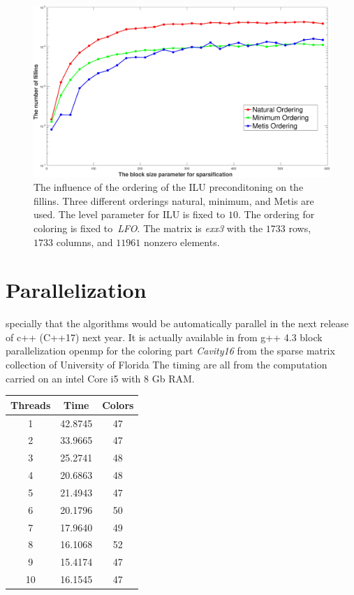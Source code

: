 \documentclass[12pt, oneside]{book}
\begin{document}
\begin{figure}
\centering
\includegraphics[width=0.9\linewidth]{fillin_blocksize.jpg}
\caption{The influence of the ordering of the ILU preconditoning 
on the fillins. 
Three different orderings natural, minimum, and Metis are used.
The level parameter for ILU is fixed to $10$. 
The ordering for coloring is fixed to~\textit{LFO}.
The matrix is \textit{exx3} with the $1733$ rows,
$1733$ columns, and $11961$ nonzero elements.}
\label{fillin_blocksize}
\end{figure}



\section{Parallelization}
\label{s.parallel}

\cite{mpi_greedy_coloring}

specially that the algorithms would be automatically parallel in the next
release of c++ (C++17) next year.
It is actually available in from g++ 4.3 
\cite{parallelcpp}
block parallelization openmp for the coloring part
\cite{Rokos2015}
\textit{Cavity16} from the sparse matrix collection of University of Florida 
The timing are all from the computation carried on 
an intel Core i5 with 8 Gb RAM. 
\begin{tabular}{|c|c|c|}
\hline
Threads & Time & Colors \\\hline
1 & 42.8745 & 47 \\\hline
2 & 33.9665 & 47 \\\hline
3 & 25.2741 & 48 \\\hline
4 & 20.6863 & 48 \\\hline
5 & 21.4943 & 47 \\\hline
6 & 20.1796 & 50 \\\hline
7 & 17.9640 & 49 \\\hline
8 & 16.1068 & 52 \\\hline
9 & 15.4174 & 47 \\\hline
10 & 16.1545 & 47 \\\hline
\end{tabular}
\end{document}
